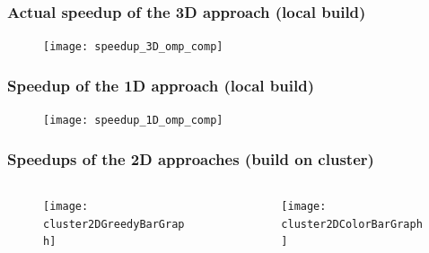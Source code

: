 \begin{frame}
	\frametitle{Actual speedup of the 3D approach (local build)}
	
	\begin{figure}
		\centering
		\texttt{[image: speedup\_3D\_omp\_comp]}
		\label{fig:speedup3dompcomp}
	\end{figure}
	
	
\end{frame}


\begin{frame}
	\frametitle{Speedup of the 1D approach (local build)}
	\begin{figure}
		\centering
		\texttt{[image: speedup\_1D\_omp\_comp]}
		\label{fig:speedup1dompcomp}
	\end{figure}
	
\end{frame}

\begin{frame}
	\frametitle{Speedups of the 2D approaches (build on cluster)}
	\begin{columns}
		
	\begin{column}{0.5\linewidth}
		\begin{figure}
			\centering
			\texttt{[image: cluster2DGreedyBarGraph]}
			\label{fig:cluster2dgreedybargraph}
		\end{figure}
		
	\end{column}
	
	\begin{column}{0.5\linewidth}
		\begin{figure}
			\centering
			\texttt{[image: cluster2DColorBarGraph]}
			\label{fig:cluster2dcolorbargraph}
		\end{figure}
	\end{column}
	\end{columns}	
\end{frame}

